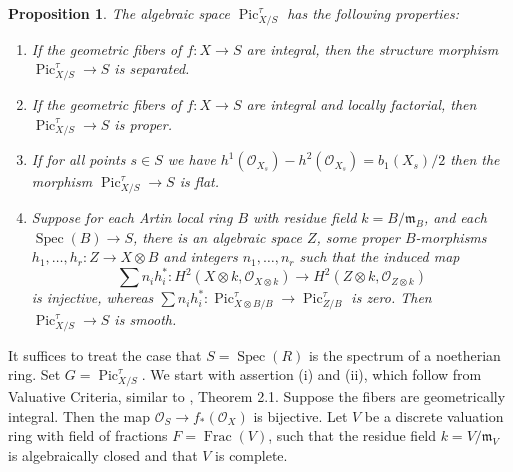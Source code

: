 \documentclass[oneside, 12pt]{amsart}
\newcommand\mylabel[1]{\label{#1}\marginpar{\raggedright\vspace{-1ex}\medskip\medskip\footnotesize \tt #1}}
\renewcommand\mylabel[1]{\label{#1}}
\newtheorem{proposition}[theorem]{Proposition}
\theoremstyle{definition}
\theoremstyle{remark}
\newcommand{\Frac}{\operatorname{Frac}}
\newcommand{\lra}{\longrightarrow}
\newcommand{\maxid}{\mathfrak{m}}
\renewcommand{\O}{\mathscr{O}}
\newcommand{\Pic}{\operatorname{Pic}}
\newcommand{\ra}{\rightarrow}
\newcommand{\Spec}{\operatorname{Spec}}
\begin{document}
\begin{proposition}
\mylabel{properties pic tau}
The algebraic space $\Pic^\tau_{X/S}$ has the following properties:
\begin{enumerate}
\item
If the geometric fibers of $f:X\ra S$ are   integral, then  the structure morphism $\Pic^\tau_{X/S}\ra S$ is   separated.
\item
If the   geometric fibers of $f:X\ra S$ are integral and   locally factorial, then  
$\Pic^\tau_{X/S}\ra S$ is proper.
\item
If for all  points $s\in S$ we have $h^1(\O_{X_s})- h^2(\O_{X_s})=b_1(X_s)/2$ then the morphism $\Pic^\tau_{X/S}\ra S$ is flat.
\item
Suppose for each Artin local ring $B$ with residue field $k=B/\maxid_B$, and each   $\Spec(B)\ra S$,
there is an algebraic space $Z$, some proper $B$-morphisms $h_1,\ldots,h_r:Z\ra X\otimes B$ and integers $n_1,\ldots,n_r$ such that the induced map
\[
\sum n_ih_i^*:H^2(X\otimes k ,\O_{X\otimes k})\lra H^2(Z\otimes k,\O_{Z\otimes k})
\]
is injective, whereas
$\sum n_ih_i^*:\Pic^\tau_{X\otimes B/B}\ra\Pic^\tau_{Z/B}$ is zero.
Then $\Pic^\tau_{X/S}\ra S$ is smooth.
\end{enumerate}
\end{proposition}
 
\proof
It suffices to treat the case that $S=\Spec(R)$ is the spectrum of a noetherian ring.
Set $G=\Pic^\tau_{X/S}$.
We start with assertion  (i) and (ii), which follow from   Valuative Criteria, similar to 
\cite{FGA VI}, Theorem 2.1. 
Suppose the fibers are geometrically integral. 
Then the map $\O_S\ra f_*(\O_X)$ is bijective.
Let $V$ be a discrete valuation ring
with field of fractions $F=\Frac(V)$, such that the residue field $k=V/\maxid_V$ is algebraically closed
and that $V$ is complete.  
\end{document}

